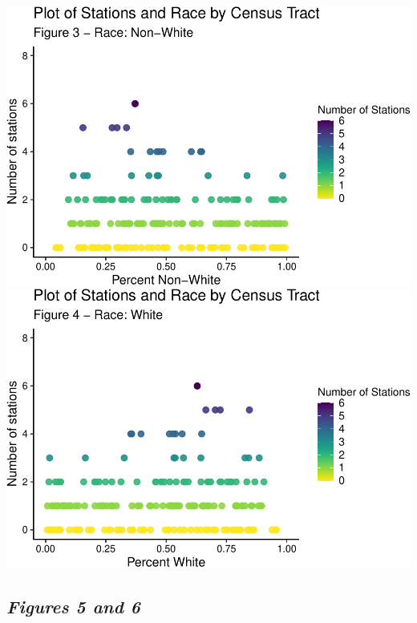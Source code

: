 \documentclass[
  12pt,
]{article}
\begin{document}
\includegraphics{Project_Template_files/figure-latex/data scatterplots prnnwht-1.pdf}
\includegraphics{Project_Template_files/figure-latex/data scatterplots prnnwht-2.pdf}

\hypertarget{figures-5-and-6}{%
\subsection{\texorpdfstring{\emph{Figures 5 and
6}}{Figures 5 and 6}}\label{figures-5-and-6}}
\end{document}
